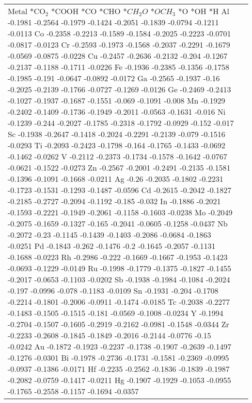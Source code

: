 \begin{table}[h]
    \centering
    \begin{tabular}{lr}
      \hline
      Metal	*CO$_2$	*COOH	*CO	*CHO	*$CH_2O$	*$OCH_3$	*O	*OH	*H
      \hline
      Al	-0.1981	-0.2564	-0.1979	-0.1424	-0.2051	-0.1839	-0.0794	-0.1211	-0.0113
      Co	-0.2358	-0.2213	-0.1589	-0.1584	-0.2025	-0.2223	-0.0701	-0.0817	-0.0123
      Cr	-0.2593	-0.1973	-0.1568	-0.2037	-0.2291	-0.1679	-0.0569	-0.0875	-0.0228
      Cu	-0.2457	-0.2636	-0.2132	-0.204	-0.1267	-0.2137	-0.1188	-0.1711	-0.0226
      Fe	-0.1936	-0.2385	-0.1356	-0.1758	-0.1985	-0.191	-0.0647	-0.0892	-0.0172
      Ga	-0.2565	-0.1937	-0.16	  -0.2025	-0.2139	-0.1766	-0.0727	-0.1269	-0.0126
      Ge	-0.2469	-0.2413	-0.1027	-0.1937	-0.1687	-0.1551	-0.069	-0.1091	-0.008
      Mn	-0.1929	-0.2402	-0.1409	-0.1736	-0.1949	-0.2011	-0.0563	-0.1631	-0.016
      Ni	-0.1239	-0.244	-0.2027	-0.1785	-0.2318	-0.1792	-0.0929	-0.152	-0.017
      Sc	-0.1938	-0.2647	-0.1418	-0.2024	-0.2291	-0.2139	-0.079	-0.1516	-0.0293
      Ti	-0.2093	-0.2423	-0.1798	-0.164	-0.1765	-0.1433	-0.0692	-0.1462	-0.0262
      V	  -0.2112	-0.2373	-0.1734	-0.1578	-0.1642	-0.0767	-0.0621	-0.1522	-0.0273
      Zn	-0.2567	-0.2001	-0.2491	-0.2135	-0.1581	-0.1396	-0.1091	-0.1668	-0.0211
      Ag	-0.26	  -0.2035	-0.1802	-0.2231	-0.1723	-0.1531	-0.1293	-0.1487	-0.0596
      Cd	-0.2615	-0.2042	-0.1827	-0.2185	-0.2727	-0.2094	-0.1192	-0.185	-0.032
      In	-0.1886	-0.2021	-0.1593	-0.2221	-0.1949	-0.2061	-0.1158	-0.1603	-0.0238
      Mo	-0.2049	-0.2075	-0.1659	-0.1327	-0.165	-0.2041	-0.0605	-0.1258	-0.0437
      Nb	-0.2072	-0.23 	-0.1145	-0.1439	-0.1403	-0.2086	-0.0684	-0.1863	-0.0251
      Pd	-0.1843	-0.262	-0.1476	-0.2  	-0.1645	-0.2057	-0.1131	-0.1688	-0.0223
      Rh	-0.2986	-0.222	-0.1669	-0.1667	-0.1953	-0.1423	-0.0693	-0.1229	-0.0149
      Ru	-0.1998	-0.1779	-0.1375	-0.1827	-0.1455	-0.2017	-0.0653	-0.1103	-0.0202
      Sb	-0.1938	-0.1984	-0.1084	-0.2024	-0.197	-0.0996	-0.078	-0.1183	-0.0109
      Sn	-0.1931	-0.204	-0.1708	-0.2214	-0.1801	-0.2006	-0.0911	-0.1474	-0.0185
      Tc	-0.2038	-0.2277	-0.1483	-0.1505	-0.1515	-0.181	-0.0569	-0.1008	-0.0234
      Y 	-0.1994	-0.2704	-0.1507	-0.1605	-0.2919	-0.2162	-0.0981	-0.1548	-0.0344
      Zr	-0.2233	-0.2608	-0.1845	-0.1849	-0.2016	-0.2144	-0.0776	-0.15 	-0.0242
      Au	-0.1872	-0.1923	-0.2237	-0.1738	-0.1907	-0.2639	-0.1497	-0.1276	-0.0301
      Bi	-0.1978	-0.2736	-0.1731	-0.1581	-0.2369	-0.0995	-0.0937	-0.1386	-0.0171
      Hf	-0.2235	-0.2562	-0.1836	-0.1839	-0.1987	-0.2082	-0.0759	-0.1417	-0.0211
      Hg	-0.1907	-0.1929	-0.1053	-0.0955	-0.1765	-0.2558	-0.1157	-0.1694	-0.0357

\end{tabular}
\end{table}
